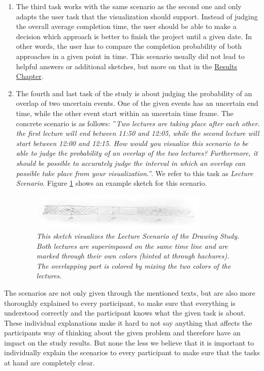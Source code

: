 \begin{enumerate}
	\item The third task works with the same scenario as the second one and only adapts the user task that the visualization should support. Instead of judging the overall average completion time, the user should be able to make a decision which approach is better to finish the project until a given date. In other words, the user has to compare the completion probability of both approaches in a given point in time. This scenario usually did not lead to helpful answers or additional sketches, but more on that in the \hyperref[ch:results]{Results Chapter}.
	
	\item The fourth and last task of the study is about judging the probability of an overlap of two uncertain events. One of the given events has an uncertain end time, while the other event start within an uncertain time frame. The concrete scenario is as follows: ''\textit{Two lectures are taking place after each other. the first lecture will end between 11:50 and 12:05, while the second lecture will start between 12:00 and 12:15. How would you visualize this scenario to be able to judge the probability of an overlap of the two lectures? Furthermore, it should be possible to accurately judge the interval in which an overlap can possible take place from your visualization.}''. We refer to this task as \textit{Lecture Scenario}. Figure \ref{fig:drawingT4} shows an example sketch for this scenario.
	
	\begin{figure}[H]
		\centering
		\includegraphics[width=0.8\textwidth]{figures/drawingT4.png}
		\caption{\textit{This sketch visualizes the \textit{Lecture Scenario} of the Drawing Study. Both lectures are superimposed on the same time line and are marked through their own colors (hinted at through hachures). The overlapping part is colored by mixing the two colors of the lectures.}}
		\label{fig:drawingT4}
	\end{figure}
\end{enumerate} 

The scenarios are not only given through the mentioned texts, but are also more thoroughly explained to every participant, to make sure that everything is understood correctly and the participant knows what the given task is about. These individual explanations make it hard to not say anything that affects the participants way of thinking about the given problem and therefore have an impact on the study results. But none the less we believe that it is important to individually explain the scenarios to every participant to make sure that the tasks at hand are completely clear. \par \medskip


